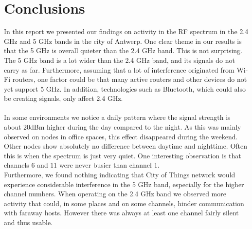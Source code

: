 \documentclass[a4paper, 11pt]{article}
\begin{document}
\section{Conclusions}
In this report we presented our findings on activity in the RF spectrum in the 2.4 GHz and 5 GHz bands in the city of Antwerp. One clear theme in our results is that the 5 GHz is overall quieter than the 2.4 GHz band. This is not surprising. The 5 GHz band is a lot wider than the 2.4 GHz band, and its signals do not carry as far. Furthermore, assuming that a lot of interference originated from Wi-Fi routers, one factor could be that many active routers and other devices do not yet support 5 GHz. In addition, technologies such as Bluetooth, which could also be creating signals, only affect 2.4 GHz.\\ \\
In some environments we notice a daily pattern where the signal strength is about 20dBm higher during the day compared to the night. As this was mainly observed on nodes in office spaces, this effect disappeared during the weekend. Other nodes show absolutely no difference between daytime and nighttime. Often this is when the spectrum is just very quiet. One interesting observation is that channels 6 and 11 were never busier than channel 1. \\
Furthermore, we found nothing indicating that City of Things network would experience considerable interference in the 5 GHz band, especially for the higher channel numbers. When operating on the 2.4 GHz band we observed more activity that could, in some places and on some channels, hinder communication with faraway hosts. However there was always at least one channel fairly silent and thus usable.






\end{document}
